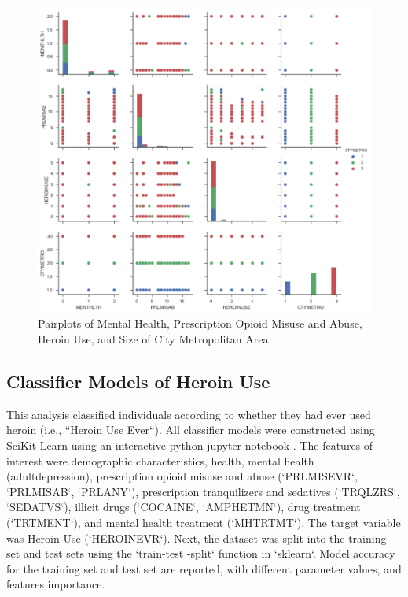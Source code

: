 \documentclass[sigconf]{acmart}
\begin{document}
\begin{figure}[!ht]
  \centering\includegraphics[width=\columnwidth]{images/Figure3.pdf}
  \caption{Pairplots of Mental Health, Prescription Opioid Misuse and Abuse,
  Heroin Use, and Size of City Metropolitan Area}
  \label{f:Figure3}
\end{figure}


\subsection{Classifier Models of Heroin Use}

This analysis classified individuals according to whether they had ever used 
heroin (i.e., ``Heroin Use Ever``). All classifier models were constructed 
using SciKit Learn \cite{muller17} using an interactive python jupyter 
notebook \cite{classifyH}. The features of interest were demographic 
characteristics, health, mental health (adultdepression), prescription 
opioid misuse and abuse (`PRLMISEVR`, `PRLMISAB`, `PRLANY`), prescription 
tranquilizers and sedatives (`TRQLZRS`, `SEDATVS`), illicit drugs (`COCAINE`, 
`AMPHETMN`), drug treatment (`TRTMENT`), and mental health treatment 
(`MHTRTMT`). The target variable was Heroin Use (`HEROINEVR`). Next, the 
dataset was split into the training set and test sets using the `train-test
-split` function in `sklearn`. Model accuracy for the training set and test 
set are reported, with different parameter values, and features importance. 
\end{document}

